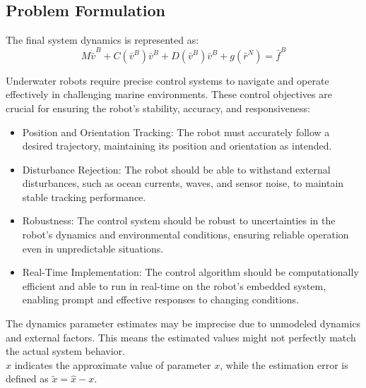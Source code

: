 
\subsection{Problem Formulation}

The final system dynamics is represented as:
$$
M \dot{\bar{v}}^B + C(\bar{v}^B)\bar{v}^B + D(\bar{v}^B)\bar{v}^B + g(\bar{r}^N)= \bar{f}^B
$$

Underwater robots require precise control systems to navigate and operate effectively
in challenging marine environments. These control objectives are crucial for ensuring
the robot's stability, accuracy, and responsiveness:
\begin{itemize}
    \item Position and Orientation Tracking: 
    The robot must accurately follow a desired trajectory, maintaining its position 
    and orientation as intended.
    \item Disturbance Rejection: 
    The robot should be able to withstand external disturbances, such as ocean 
    currents, waves, and sensor noise, to maintain stable tracking performance.
    \item Robustness: 
    The control system should be robust to uncertainties in the robot's dynamics 
    and environmental conditions, ensuring reliable operation even in unpredictable 
    situations.
    \item Real-Time Implementation: 
    The control algorithm should be computationally efficient and able to run in 
    real-time on the robot's embedded system, enabling prompt and effective 
    responses to changing conditions.
\end{itemize}


The dynamics parameter estimates may be imprecise due to unmodeled dynamics and external 
factors. This means the estimated values might not perfectly match the actual system behavior.\\
$\hat x$ indicates the approximate value of parameter $x$, while 
the estimation error is defined as $\tilde x = \hat x - x$.

